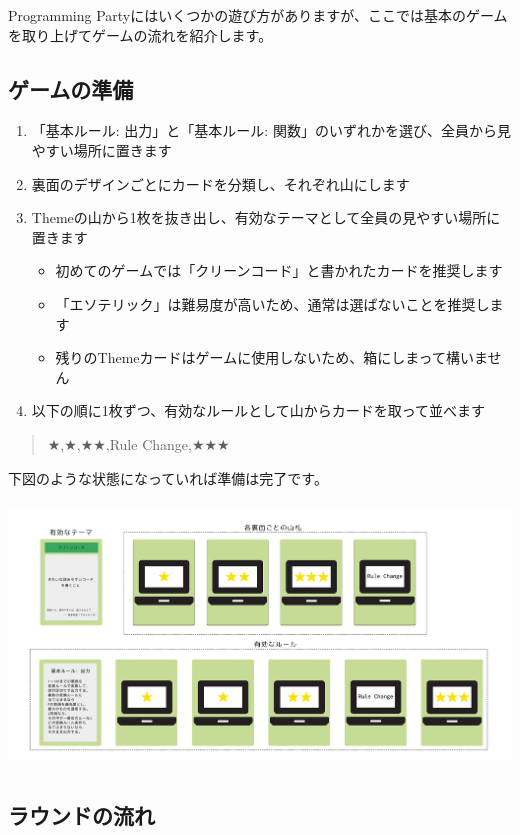 \documentclass[index]{subfiles}
\begin{document}
  Programming Partyにはいくつかの遊び方がありますが、ここでは基本のゲームを取り上げてゲームの流れを紹介します。
  
  \subsection{ゲームの準備}

\begin{enumerate}
\item 「基本ルール: 出力」と「基本ルール: 関数」のいずれかを選び、全員から見やすい場所に置きます
\item 裏面のデザインごとにカードを分類し、それぞれ山にします
\item Themeの山から1枚を抜き出し、有効なテーマとして全員の見やすい場所に置きます
  \begin{itemize}
  \item 初めてのゲームでは「クリーンコード」と書かれたカードを推奨します
  \item 「エソテリック」は難易度が高いため、通常は選ばないことを推奨します
  \item 残りのThemeカードはゲームに使用しないため、箱にしまって構いません
  \end{itemize}
\item 以下の順に1枚ずつ、有効なルールとして山からカードを取って並べます
\end{enumerate}
\begin{quote}
★,★,★★,Rule Change,★★★
\end{quote}

下図のような状態になっていれば準備は完了です。

\begin{center}
  \includegraphics[height=7cm]{image/109_game_start.png}
\end{center}

  \subsection{ラウンドの流れ}
\end{document}
